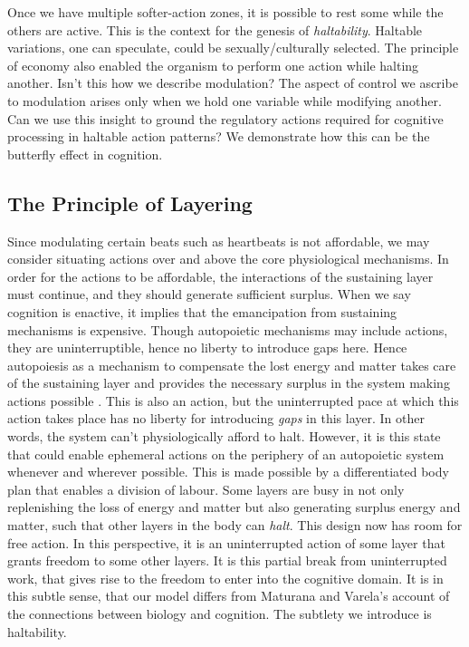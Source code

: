 Once we have multiple softer-action zones, it is possible to rest some while the others are active. This is the context for the genesis of \textit{haltability}. Haltable variations, one can speculate, could be sexually/culturally selected. The principle of economy also enabled the organism to perform one action while halting another. Isn't this how we describe modulation? The aspect of control we ascribe to modulation arises only when we hold one variable while modifying another. Can we use this insight to ground the regulatory actions required for cognitive processing in haltable action patterns? We demonstrate how this can be the butterfly effect in cognition.

\subsection{The Principle of Layering}
\label{subsec:principle_layering}

Since modulating certain beats such as heartbeats is not affordable, we may consider situating actions over and above the core physiological mechanisms. In order for the actions to be affordable, the interactions of the sustaining layer must continue, and they should generate sufficient surplus. When we say cognition is enactive, it implies that the emancipation from sustaining mechanisms is expensive. Though autopoietic mechanisms may include actions, they are uninterruptible, hence no liberty to introduce gaps here. Hence autopoiesis as a mechanism to compensate the lost energy and matter takes care of the sustaining layer and provides the necessary surplus in the system making actions possible \cite{maturana1991autopoiesis}. This is also an action, but the uninterrupted pace at which this action takes place has no liberty for introducing \textit{gaps} in this layer. In other words, the system can't physiologically afford to halt. However, it is this state that could enable ephemeral actions on the periphery of an autopoietic system whenever and wherever possible. This is made possible by a differentiated body plan that enables a division of labour. Some layers are busy in not only replenishing the loss of energy and matter but also generating surplus energy and matter, such that other layers in the body can \textit{halt}. This design now has room for free action. In this perspective, it is an uninterrupted action of some layer that grants freedom to some other layers. It is this partial break from uninterrupted work, that gives rise to the freedom to enter into the cognitive domain. It is in this subtle sense, that our model differs from Maturana and Varela's account of the connections between biology and cognition. The subtlety we introduce is haltability.

